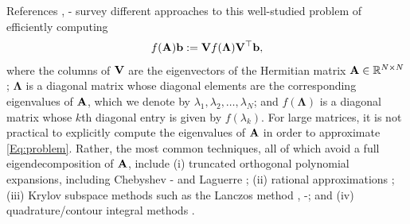 \documentclass{article}
\begin{document}
References \cite[Chapter 13]{higham}, \cite{davies2005computing}\nocite{frommer}-\cite{moler2003nineteen} survey different approaches to this well-studied problem of efficiently computing 
\begin{align}\label{Eq:problem}
f({\bf A}){\bf b}:={\bf V}f({\boldsymbol \Lambda}){\bf V}^{\top}{\bf b},
\end{align}
where the columns of ${\bf V}$ are the eigenvectors of the Hermitian matrix ${\bf A}\in \mathbb{R}^{N \times N}$; ${\boldsymbol \Lambda}$ is a diagonal matrix whose diagonal elements are the corresponding eigenvalues of ${\bf A}$, which we denote by $\lambda_1, \lambda_2, \ldots, \lambda_N$; and $f({\boldsymbol \Lambda})$ is a diagonal matrix whose $k$th diagonal entry is given by $f(\lambda_k)$. For large matrices, it is not practical to explicitly compute the eigenvalues of ${\bf A}$ in order to approximate \eqref{Eq:problem}. Rather, the most common %
techniques, all of which avoid a full eigendecomposition of ${\bf A}$, include (i) truncated orthogonal polynomial expansions, including Chebyshev \cite{druskin}\nocite{saad2006filtered}-\cite{chen_saad} and Laguerre \cite{sheehan2010computing}; (ii) rational approximations \cite[Section 3.4]{frommer}; (iii) Krylov subspace methods such as the Lanczos method \cite{druskin}, \cite{druskin1998extended}\nocite{eiermann2006restarted,afanasjew2008implementation}-\cite{frommer2017radau}; and (iv) quadrature/contour integral methods \cite[Section 13.3]{higham}. 
\end{document}
